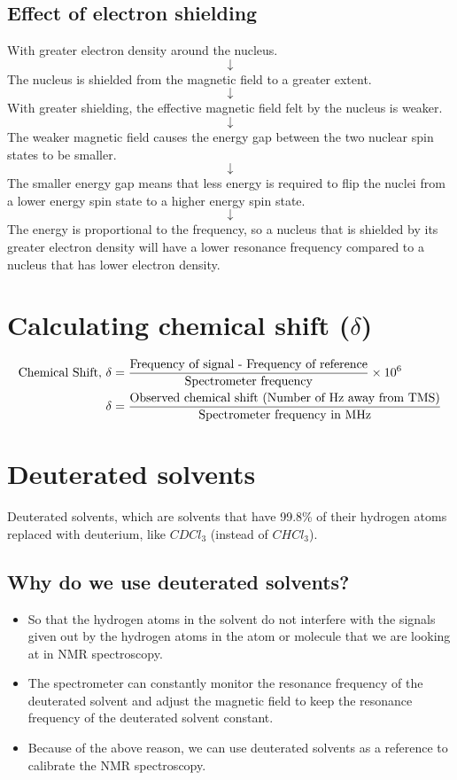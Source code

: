\documentclass[11pt]{article}
\begin{document}
\subsection{Effect of electron shielding}
\label{sec:orgfa54cd2}
With greater electron density around the nucleus.
\[\downarrow\]
The nucleus is shielded from the magnetic field to a greater extent.
\[\downarrow\]
With greater shielding, the effective magnetic field felt by the nucleus is weaker.
\[\downarrow\]
The weaker magnetic field causes the energy gap between the two nuclear spin states to be smaller.
\[\downarrow\]
The smaller energy gap means that less energy is required to flip the nuclei from a lower energy spin state to a higher energy spin state.
\[\downarrow\]
The energy is proportional to the frequency, so a nucleus that is shielded by its greater electron density will have a lower resonance frequency compared to a nucleus that has lower electron density.
\section{Calculating chemical shift (\(\delta\))}
\label{sec:org1dfbe35}
\begin{align*}
\text{Chemical Shift, } \delta &= \frac{\text{Frequency of signal - Frequency of reference}}{\text{Spectrometer frequency}} \times 10^6 \\
\delta &= \frac{\text{Observed chemical shift (Number of \si{\hertz} away from TMS)}}{\text{Spectrometer frequency in \si{\mega\hertz}}}
\end{align*}
\section{Deuterated solvents}
\label{sec:org7a6e563}
Deuterated solvents, which are solvents that have 99.8\% of their hydrogen atoms replaced with deuterium, like \(CDCl_3\) (instead of \(CHCl_3\)).
\subsection{Why do we use deuterated solvents?}
\label{sec:org7192c36}
\begin{itemize}
\item So that the hydrogen atoms in the solvent do not interfere with the signals given out by the hydrogen atoms in the atom or molecule that we are looking at in NMR spectroscopy.
\item The spectrometer can constantly monitor the resonance frequency of the deuterated solvent and adjust the magnetic field to keep the resonance frequency of the deuterated solvent constant.
\item Because of the above reason, we can use deuterated solvents as a reference to calibrate the NMR spectroscopy.
\end{itemize}
\end{document}
